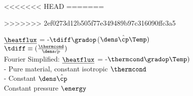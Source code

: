 <<<<<<< HEAD
=======


>>>>>>> 2ef0273d12b505f77e349489b97c316090ffc3a5
\begin{mdframed}

   
     $\underline{\heatflux}$ = -$\tdiff\gradop$($\dens\hat{\cp}\Temp)$ \\
    
     $\tdiff \equiv (\frac{\thermcond}{\dens\hat{cp}})$\\
    
    Fourier Simplified: $\underline{\heatflux}$ = -$\thermcond\gradop\Temp)$ \\
    
    - Pure material, constant isotropic $\thermcond$ \\
    
    - Constant $\dens\hat{\cp}$\\
    Constant pressure 
    $\energy$
    
\end{mdframed}